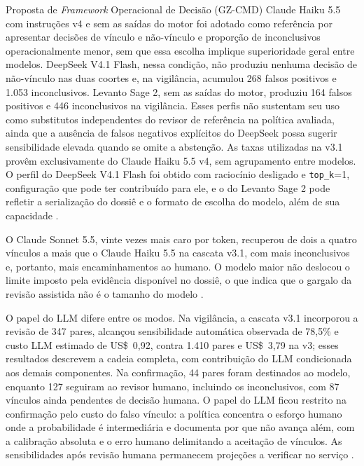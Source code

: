 \begin{chapter}{Proposta de \textit{Framework} Operacional de Decisão (GZ-CMD)}
Claude Haiku 5.5 com instruções v4 e sem as saídas do motor foi adotado como referência por apresentar decisões de vínculo e não-vínculo e proporção de inconclusivos operacionalmente menor, sem que essa escolha implique superioridade geral entre modelos. DeepSeek V4.1 Flash, nessa condição, não produziu nenhuma decisão de não-vínculo nas duas coortes e, na vigilância, acumulou 268 falsos positivos e 1.053 inconclusivos. Levanto Sage 2, sem as saídas do motor, produziu 164 falsos positivos e 446 inconclusivos na vigilância. Esses perfis não sustentam seu uso como substitutos independentes do revisor de referência na política avaliada, ainda que a ausência de falsos negativos explícitos do DeepSeek possa sugerir sensibilidade elevada quando se omite a abstenção. As taxas utilizadas na v3.1 provêm exclusivamente do Claude Haiku 5.5 v4, sem agrupamento entre modelos. O perfil do DeepSeek V4.1 Flash foi obtido com raciocínio desligado e \texttt{top\_k}=1, configuração que pode ter contribuído para ele, e o do Levanto Sage 2 pode refletir a serialização do dossiê e o formato de escolha do modelo, além de sua capacidade \cite{Jardim2026phdrepo}.

O Claude Sonnet 5.5, vinte vezes mais caro por token, recuperou de dois a quatro vínculos a mais que o Claude Haiku 5.5 na cascata v3.1, com mais inconclusivos e, portanto, mais encaminhamentos ao humano. O modelo maior não deslocou o limite imposto pela evidência disponível no dossiê, o que indica que o gargalo da revisão assistida não é o tamanho do modelo \cite{Jardim2026phdrepo}.

O papel do LLM difere entre os modos. Na vigilância, a cascata v3.1 incorporou a revisão de 347 pares, alcançou sensibilidade automática observada de 78,5\% e custo LLM estimado de US\$~0,92, contra 1.410 pares e US\$~3,79 na v3; esses resultados descrevem a cadeia completa, com contribuição do LLM condicionada aos demais componentes. Na confirmação, 44 pares foram destinados ao modelo, enquanto 127 seguiram ao revisor humano, incluindo os inconclusivos, com 87 vínculos ainda pendentes de decisão humana. O papel do LLM ficou restrito na confirmação pelo custo do falso vínculo: a política concentra o esforço humano onde a probabilidade é intermediária e documenta por que não avança além, com a calibração absoluta e o erro humano delimitando a aceitação de vínculos. As sensibilidades após revisão humana permanecem projeções a verificar no serviço \cite{Jardim2026phdrepo}.


\end{chapter}
